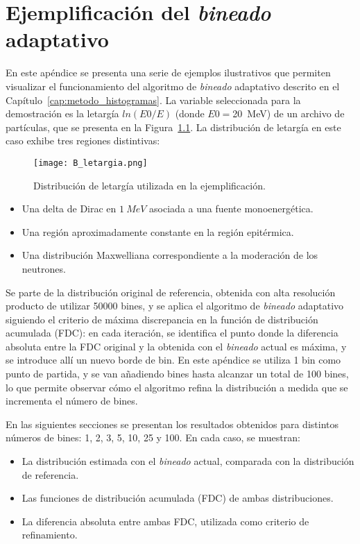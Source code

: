 \chapter{Ejemplificación del \textit{bineado} adaptativo}
\label{app:A}

En este apéndice se presenta una serie de ejemplos ilustrativos que permiten visualizar el funcionamiento del algoritmo de \textit{bineado} adaptativo descrito en el Capítulo~\ref{cap:metodo_histogramas}. La variable seleccionada para la demostración es la letargía $ln(E0/E)$ (donde $E0 = $20~MeV) de un archivo de partículas, que se presenta en la Figura~\ref{fig:B_letargia}. La distribución de letargía en este caso exhibe tres regiones distintivas:

\begin{figure}[H]
    \centering
    \texttt{[image: B\_letargia.png]}
    \caption{Distribución de letargía utilizada en la ejemplificación.}
    \label{fig:B_letargia}
\end{figure}

\begin{itemize}
    \item Una delta de Dirac en $1~MeV$ asociada a una fuente monoenergética.
    \item Una región aproximadamente constante en la región epitérmica.
    \item Una distribución Maxwelliana correspondiente a la moderación de los neutrones.
\end{itemize}

Se parte de la distribución original de referencia, obtenida con alta resolución producto de utilizar 50000 bines, y se aplica el algoritmo de \textit{bineado} adaptativo siguiendo el criterio de máxima discrepancia en la función de distribución acumulada (FDC): en cada iteración, se identifica el punto donde la diferencia absoluta entre la FDC original y la obtenida con el \textit{bineado} actual es máxima, y se introduce allí un nuevo borde de bin. En este apéndice se utiliza 1 bin como punto de partida, y se van añadiendo bines hasta alcanzar un total de 100 bines, lo que permite observar cómo el algoritmo refina la distribución a medida que se incrementa el número de bines.

En las siguientes secciones se presentan los resultados obtenidos para distintos números de bines: 1, 2, 3, 5, 10, 25 y 100. En cada caso, se muestran:

\begin{itemize}
    \item La distribución estimada con el \textit{bineado} actual, comparada con la distribución de referencia.
    \item Las funciones de distribución acumulada (FDC) de ambas distribuciones.
    \item La diferencia absoluta entre ambas FDC, utilizada como criterio de refinamiento.
\end{itemize}

